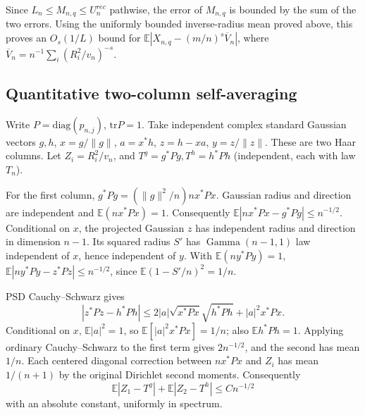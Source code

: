 \documentclass[11pt]{article}
\begin{document}
Since \(L_n\le M_{n,q}\le U_n^{rec}\) pathwise, the error of \(M_{n,q}\) is bounded by the sum of the two errors. Using the uniformly bounded inverse-radius mean proved above, this proves an \(O_s(1/L)\) bound for \(\mathbb E|X_{n,q}-(m/n)^s\overline V_n|\), where \(\overline V_n=n^{-1}\sum_i(R_i^2/v_n)^{-s}\).

\subsection{Quantitative two-column self-averaging}\label{quantitative-two-column-self-averaging}

Write \(P=\mathrm{diag}(p_{n,j})\), \(\mathrm{tr}P=1\). Take independent complex standard Gaussian vectors \(g,h\), \(x=g/\|g\|\), \(a=x^*h\), \(z=h-xa\), \(y=z/\|z\|\). These are two Haar columns. Let \(Z_i=R_i^2/v_n\), and \(T^g=g^*Pg,T^h=h^*Ph\) (independent, each with law \(T_n\)).

For the first column, \(g^*Pg=(\|g\|^2/n)nx^*Px\). Gaussian radius and direction are independent and \(\mathbb E(nx^*Px)=1\). Consequently \(\mathbb E|nx^*Px-g^*Pg|\le n^{-1/2}\). Conditional on \(x\), the projected Gaussian \(z\) has independent radius and direction in dimension \(n-1\). Its squared radius \(S'\) has \(\operatorname{Gamma}(n-1,1)\) law independent of \(x\), hence independent of \(y\). With \(\mathbb E(ny^*Py)=1\), \(\mathbb E|ny^*Py-z^*Pz|\le n^{-1/2}\), since \(\mathbb E(1-S'/n)^2=1/n\).

PSD Cauchy--Schwarz gives \[|z^*Pz-h^*Ph|\le 2|a|\sqrt{x^*Px}\sqrt{h^*Ph}+|a|^2x^*Px.\] Conditional on \(x\), \(\mathbb E|a|^2=1\), so \(\mathbb E[|a|^2x^*Px]=1/n\); also \(\mathbb E h^*Ph=1\). Applying ordinary Cauchy--Schwarz to the first term gives \(2n^{-1/2}\), and the second has mean \(1/n\). Each centered diagonal correction between \(nx^*Px\) and \(Z_i\) has mean \(1/(n+1)\) by the original Dirichlet second moments. Consequently \[\mathbb E|Z_1-T^g|+\mathbb E|Z_2-T^h|\le C n^{-1/2}\] with an absolute constant, uniformly in spectrum.
\end{document}
